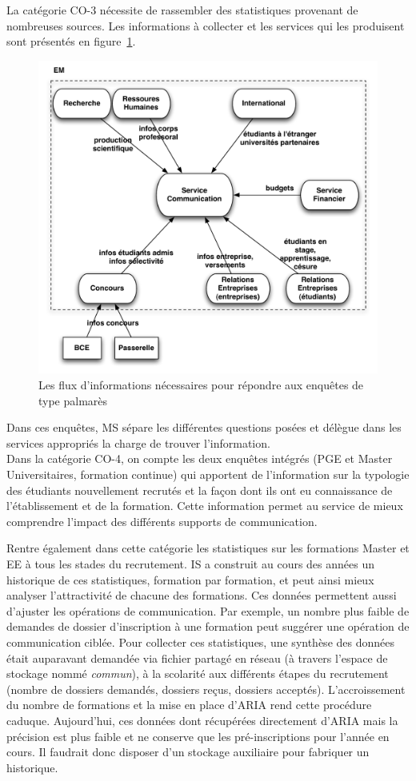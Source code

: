 \documentclass{book}
\begin{document}
La catégorie CO-3 nécessite de rassembler des statistiques provenant de 
nombreuses sources. Les informations à collecter et les services qui les 
produisent sont présentés en figure~\ref{fg:comm_flux}.
\begin{figure}[hbt]
\begin{center}
\includegraphics[width=.75\linewidth]{figs/comm_flux.pdf}
\end{center}
\caption{Les flux d'informations nécessaires pour répondre aux enquêtes de 
type palmarès}
\label{fg:comm_flux}
\end{figure}
Dans ces enquêtes, MS sépare les différentes questions posées et délègue
dans les services appropriés la charge de trouver l'information.\\


Dans la catégorie CO-4, on compte les deux enquêtes intégrés (PGE et Master 
Universitaires, formation continue) qui apportent de l'information sur la 
typologie des étudiants nouvellement recrutés et la façon dont ils ont eu 
connaissance de l'établissement et de la formation. Cette information permet 
au service de mieux comprendre l'impact des différents supports de 
communication.

Rentre également dans cette catégorie les statistiques sur les formations
Master et EE à tous les stades du recrutement. IS a construit au cours 
des années un historique de ces statistiques, formation par formation,
et peut ainsi mieux analyser l'attractivité de chacune des formations.
Ces données permettent aussi d'ajuster les opérations de communication.
Par exemple, un nombre plus faible de demandes de dossier d'inscription 
à une formation peut suggérer une opération de communication ciblée.
Pour collecter ces statistiques, une synthèse des données était auparavant
demandée via fichier partagé en réseau (à travers l'espace de stockage nommé
\textit{commun}\index{\clecommun}), à la scolarité aux différents étapes 
du recrutement (nombre de dossiers demandés, dossiers reçus, dossiers acceptés). 
L'accroissement du nombre de formations et la mise en place d'ARIA rend 
cette procédure caduque. Aujourd'hui, ces données dont récupérées
directement d'ARIA mais la précision est plus faible et  ne 
conserve que les pré-inscriptions pour l'année en cours. Il faudrait
donc disposer d'un stockage auxiliaire pour fabriquer un historique.
\end{document}
